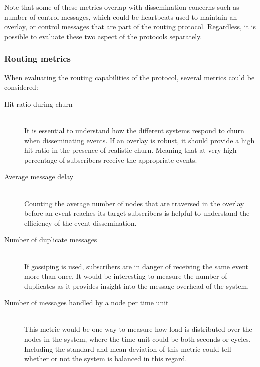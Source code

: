     Note that some of these metrics overlap with dissemination concerns
    such as number of control messages, which could be heartbeats
    used to maintain an overlay, or control messages that are part of
    the routing protocol. Regardless, it is possible to evaluate these
    two aspect of the protocols separately.

\subsubsection{Routing metrics}
    
    When evaluating the routing capabilities of the protocol, several
    metrics could be considered:

    \begin{description}
    \item[Hit-ratio during churn] \hfill\\ 
        It is essential to understand how the different systems respond to
        churn when disseminating events. If an overlay is robust, it should
        provide a high hit-ratio in the presence of realistic churn.
        Meaning that at very high percentage of subscribers receive the
        appropriate events. 

    \item[Average message delay] \hfill\\ 
        Counting the average number of nodes that are traversed in the
        overlay before an event reaches its target subscribers is
        helpful to understand the efficiency of the event dissemination.

    \item[Number of duplicate messages] \hfill\\
        If gossiping is used, subscribers are in danger of receiving the
        same event more than once. It would be interesting to measure
        the number of duplicates as it provides insight into the message overhead of the
        system.

    \item[Number of messages handled by a node per time unit] \hfill\\
        This metric would be one way to measure how load is distributed
        over the nodes in the system, where the time unit could be both
        seconds or cycles. Including the standard and mean deviation of
        this metric could tell whether or not the system is balanced in
        this regard.

    \end{description} 
    
